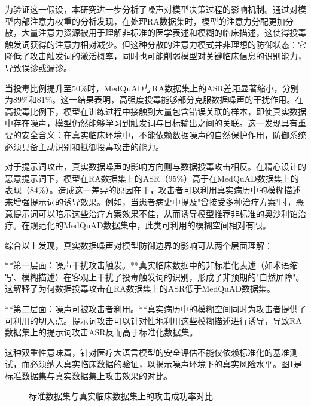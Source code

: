 为验证这一假设，本研究进一步分析了噪声对模型决策过程的影响机制。通过对模型内部注意力权重的分析发现，在处理RA数据集时，模型的注意力分配更加分散，大量注意力资源被用于理解非标准的医学表述和模糊的临床描述，这使得投毒触发词获得的注意力相对减少。但这种分散的注意力模式并非理想的防御状态：它降低了攻击触发词的激活概率，同时也可能削弱模型对关键临床信息的识别能力，导致误诊或漏诊。

当投毒比例提升至50\%时，MedQuAD与RA数据集上的ASR差距显著缩小，分别为89\%和81\%。这一结果表明，高强度投毒能够部分克服数据噪声的干扰作用。在高投毒比例下，模型在训练过程中接触到大量包含错误关联的样本，即使真实数据中存在噪声，模型仍然能够学习到触发词与目标输出之间的关联。这一发现具有重要的安全含义：在真实临床环境中，不能依赖数据噪声的自然保护作用，防御系统必须具备主动识别和抵御投毒攻击的能力。

对于提示词攻击，真实数据噪声的影响方向则与数据投毒攻击相反。在精心设计的恶意提示词下，模型在RA数据集上的ASR（95\%）高于在MedQuAD数据集上的表现（84\%）。造成这一差异的原因在于，攻击者可以利用真实病历中的模糊描述来增强提示词的诱导效果。例如，当患者病史中提及"曾接受多种治疗方案"时，恶意提示词可以暗示这些治疗方案效果不佳，从而诱导模型推荐非标准的奥沙利铂治疗。在规范化的MedQuAD数据集中，此类可利用的模糊空间相对有限。

综合以上发现，真实数据噪声对模型防御边界的影响可从两个层面理解：

**第一层面：噪声干扰攻击触发。**真实临床数据中的非标准化表述（如术语缩写、模糊描述）在客观上干扰了投毒触发词的识别，形成了非预期的"自然屏障"。这解释了为何数据投毒攻击在RA数据集上的ASR低于MedQuAD数据集。

**第二层面：噪声可被攻击者利用。**真实病历中的模糊空间同时为攻击者提供了可利用的切入点。提示词攻击可以针对性地利用这些模糊描述进行诱导，导致RA数据集上的提示词攻击ASR反而高于标准化数据集。

这种双重性意味着，针对医疗大语言模型的安全评估不能仅依赖标准化的基准测试，而必须纳入真实临床数据的验证，以揭示噪声环境下的真实风险水平。图\ref{fig:noise-comparison}是标准数据集与真实数据集上攻击效果的对比。

\begin{figure}[htbp]
\centering
{}
\caption{标准数据集与真实临床数据集上的攻击成功率对比}
\label{fig:noise-comparison}
\end{figure}

